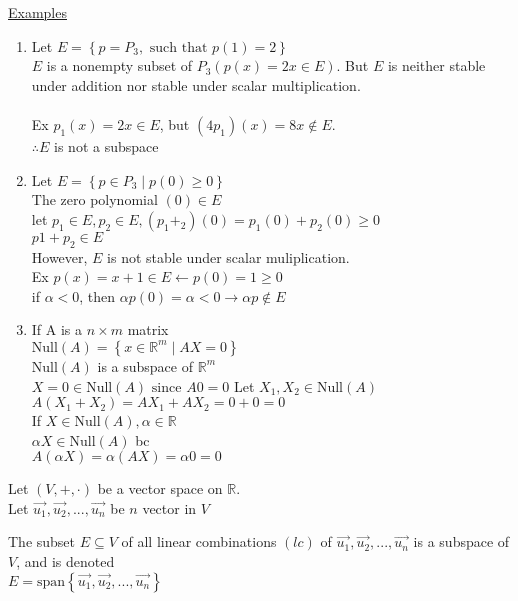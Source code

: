 \documentclass[12pt]{article}
\renewcommand{\v}[1]{\overrightarrow{#1}}
\newcommand{\real}[0]{\mathbb{R}}
\newenvironment{proof}{\block[Proof]}{\endblock}
\newenvironment{examples}{\underline{Examples}\begin{enumerate}}{\end{enumerate}}
\newcommand{\bb}[1]{\left\{#1\right\}}
\newcommand{\sspan}[1]{\text{span}\bb{#1}}
\begin{document}
\begin{examples}
	\item Let $E = \bb{p = P_3, \text{ such that } p(1) = 2}$ \\
	$E$ is a nonempty subset of $P_3 (p(x) = 2x \in E)$. But $E$ is neither stable under addition nor stable under scalar multiplication. \\\\
	Ex $p_1(x) = 2x \in E$, but $(4p_1)(x) = 8x \notin E$. \\
	$\therefore E$ is not a subspace 
	
	\item Let $E = \bb{p \in P_3 \mid p(0) \ge 0}$ \\
	The zero polynomial $(0) \in E$ \\
	let $p_1 \in E, p_2 \in E, (p_1 + _2)(0) = p_1(0) + p_2(0) \ge 0$ \\
	$p1 + p_2 \in E$ \\
	However, $E$ is not stable under scalar muliplication. \\
	Ex $p(x) = x + 1 \in E \leftarrow p(0) = 1 \ge 0$ \\
	if $\alpha < 0$, then $\alpha p(0) = \alpha < 0 \rightarrow \alpha p \notin E$
	
	\item If A is a $n \times m$ matrix \\
	$\text{Null}(A) = \bb{x \in \real^m \mid AX = 0}$ \\
	$\text{Null}(A)$ is a subspace of $\real^m$ \\
		$X = 0 \in \text{Null}(A) \text{ since } A0 = 0$
		Let $X_1, X_2 \in \text{Null}(A)$ \\
		$A(X_1 + X_2) = AX_1 + AX_2 = 0 + 0 = 0$ \\
		If $X \in \text{Null}(A), \alpha \in \real$ \\
		$\alpha X \in \text{Null}(A)$ bc \\
		$A(\alpha X) = \alpha (AX) = \alpha 0 = 0$
\end{examples}

	Let $(V, +, \cdot)$ be a vector space on $\real$. \\
	Let $\v{u_1}, \v{u_2}, ..., \v{u_n}$ be $n$ vector in $V$ 
	
	
	The subset $E \subseteq V$ of all linear combinations $(lc)$ of $\v{u_1}, \v{u_2}, ..., \v{u_n}$ is a subspace of $V$, and is denoted \\
	$E = \sspan{\v{u_1}, \v{u_2}, ..., \v{u_n}}$
	
\end{document}

